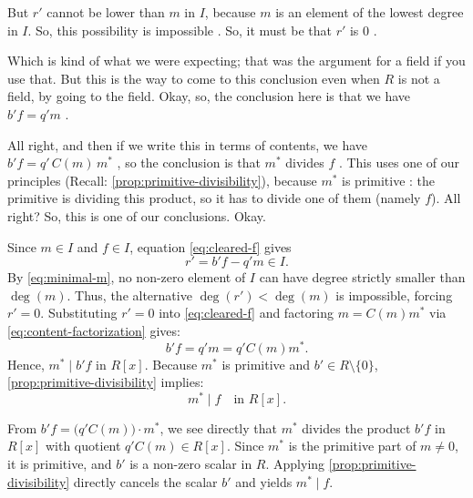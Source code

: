 \begin{proofWrapper}
\begin{speech}[00:26:40 - 00:28:07]
But $r'$ cannot be lower than $m$ in $I$, because $m$ is an element of the lowest degree in $I$. So, this possibility is impossible . So, it must be that $r'$ is $0$ .

Which is kind of what we were expecting; that was the argument for a field if you use that. But this is the way to come to this conclusion even when $R$ is not a field, by going to the field. Okay, so, the conclusion here is that we have $b' f = q' m$ .

All right, and then if we write this in terms of contents, we have $b' f = q' \, C(m) \, m^*$ , so the conclusion is that $m^*$ divides $f$ . This uses one of our principles (Recall: \cref{prop:primitive-divisibility}), because $m^*$ is primitive : the primitive is dividing this product, so it has to divide one of them (namely $f$). All right? So, this is one of our conclusions. Okay.
\end{speech}

\begin{content}
Since $m \in I$ and $f \in I$, equation \eqref{eq:cleared-f} gives
\[
r' = b' f - q' m \in I.
\]
By \eqref{eq:minimal-m}, no non-zero element of $I$ can have degree strictly smaller than $\deg(m)$. Thus, the alternative $\deg(r') < \deg(m)$ is impossible, forcing $r' = 0$. Substituting $r' = 0$ into \eqref{eq:cleared-f} and factoring $m = C(m) m^*$ via \eqref{eq:content-factorization} gives:
\begin{equation}\label{eq:bprime-f}
b' f = q' m = q' C(m) m^*.
\end{equation}
Hence, $m^* \mid b' f$ in $R[x]$. Because $m^*$ is primitive and $b' \in R \setminus \{0\}$, \cref{prop:primitive-divisibility} implies:
\begin{equation}\label{eq:mstar-div-f}
m^* \mid f \quad \text{in } R[x].
\end{equation}

\begin{steps}
From $b' f = \bigl(q' C(m)\bigr) \cdot m^*$, we see directly that $m^*$ divides the product $b' f$ in $R[x]$ with quotient $q' C(m) \in R[x]$. Since $m^*$ is the primitive part of $m \neq 0$, it is primitive, and $b'$ is a non-zero scalar in $R$. Applying \cref{prop:primitive-divisibility} directly cancels the scalar $b'$ and yields $m^* \mid f$.
\end{steps}
\end{content}


\end{proofWrapper}
